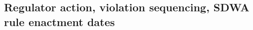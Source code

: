 \documentclass{article}
\begin{document}






\subsection{Regulator action, violation sequencing, SDWA rule enactment dates}









\printbibliography
\end{document}
